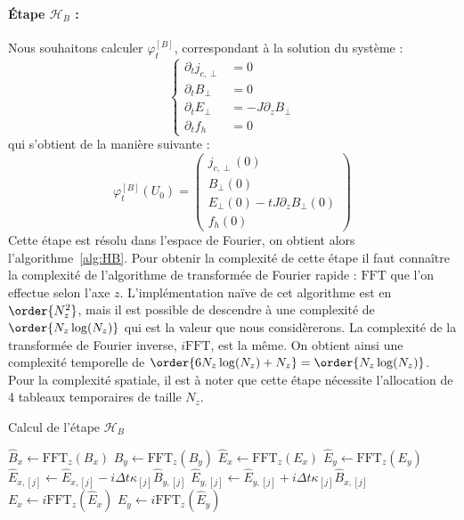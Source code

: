 \paragraph{Étape $\mathcal{H}_B$ :}
Nous souhaitons calculer $\varphi_t^{[B]}$, correspondant à la solution du système :
$$
  \begin{cases}
    \partial_t j_{c,\perp} &= 0 \\
    \partial_t B_\perp     &= 0 \\
    \partial_t E_\perp     &= -J\partial_zB_\perp \\
    \partial_t f_h         &= 0
  \end{cases}
$$
qui s'obtient de la manière suivante :
$$
  \varphi_t^{[B]}(U_0) = \begin{pmatrix}
    j_{c,\perp}(0) \\
    B_\perp(0) \\
    E_\perp(0) - tJ\partial_zB_\perp(0) \\
    f_h(0)
  \end{pmatrix}
$$
Cette étape est résolu dans l'espace de Fourier, on obtient alors l'algorithme~\ref{alg:HB}. Pour obtenir la complexité de cette étape il faut connaître la complexité de l'algorithme de transformée de Fourier rapide : $\text{FFT}$ que l'on effectue selon l'axe $z$. L'implémentation naïve de cet algorithme est en $\order{N_z^2}$, mais il est possible de descendre à une complexité de $\order{N_z\log(N_z)}$ qui est la valeur que nous considèrerons. La complexité de la transformée de Fourier inverse, $i\text{FFT}$, est la même. On obtient ainsi une complexité temporelle de $\order{6N_z\log(N_z)+N_z}=\order{N_z\log(N_z)}$. Pour la complexité spatiale, il est à noter que cette étape nécessite l'allocation de 4 tableaux temporaires de taille $N_z$.
\begin{algorithm}
  \caption{Calcul de l'étape $\mathcal{H}_{B}$}
  \label{alg:HB}
  \begin{algorithmic}[1]
      \State $\hat{B}_x \gets \text{FFT}_z(B_x)$
      \State $\hat{B}_y \gets \text{FFT}_z(B_y)$
      \State $\hat{E}_x \gets \text{FFT}_z(E_x)$
      \State $\hat{E}_y \gets \text{FFT}_z(E_y)$
        \State $\hat{E}_{x,[j]} \gets \hat{E}_{x,[j]} - i\Delta t \kappa_{[j]} \hat{B}_{y,[j]}$
        \State $\hat{E}_{y,[j]} \gets \hat{E}_{y,[j]} + i\Delta t \kappa_{[j]} \hat{B}_{x,[j]}$
      \EndFor
      \State $E_x \gets i\text{FFT}_z(\hat{E}_x)$
      \State $E_y \gets i\text{FFT}_z(\hat{E}_y)$
    \EndFunction
  \end{algorithmic}
\end{algorithm}

